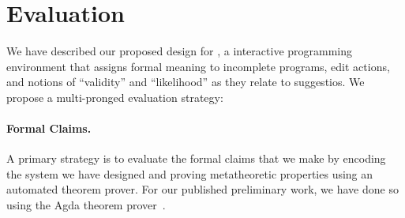 










\section{Evaluation}
\label{sec:eval}

We have described our proposed design for \HazelEnv, a interactive programming environment that assigns formal meaning  
to incomplete programs, edit actions, and notions of ``validity'' and
``likelihood'' as they relate to suggestios. We propose a multi-pronged evaluation
strategy: 

\paragraph{Formal Claims.} 
A primary strategy is to evaluate the formal claims that we make by encoding
the system we have designed and proving metatheoretic properties using an
automated theorem prover. For our published preliminary work, we have done so
using the Agda theorem prover~\cite{norell2009dependently}.

